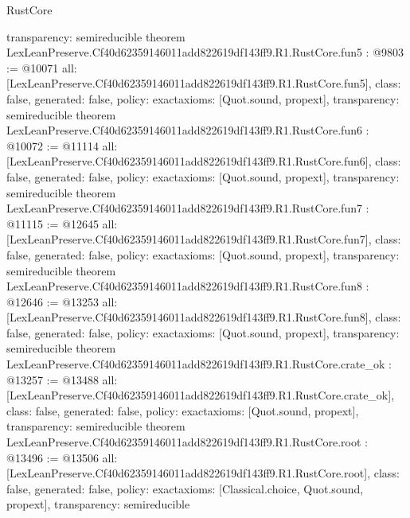 \begin{lexlean}{RustCore}
\begin{coremodule}
{  transparency: semireducible
}
theorem LexLeanPreserve.Cf40d62359146011add822619df143ff9.R1.RustCore.fun5 : @9803 := @10071 {
  all: [LexLeanPreserve.Cf40d62359146011add822619df143ff9.R1.RustCore.fun5],
  class: false,
  generated: false,
  policy: exact{axioms: [Quot.sound, propext]},
  transparency: semireducible
}
theorem LexLeanPreserve.Cf40d62359146011add822619df143ff9.R1.RustCore.fun6 : @10072 := @11114 {
  all: [LexLeanPreserve.Cf40d62359146011add822619df143ff9.R1.RustCore.fun6],
  class: false,
  generated: false,
  policy: exact{axioms: [Quot.sound, propext]},
  transparency: semireducible
}
theorem LexLeanPreserve.Cf40d62359146011add822619df143ff9.R1.RustCore.fun7 : @11115 := @12645 {
  all: [LexLeanPreserve.Cf40d62359146011add822619df143ff9.R1.RustCore.fun7],
  class: false,
  generated: false,
  policy: exact{axioms: [Quot.sound, propext]},
  transparency: semireducible
}
theorem LexLeanPreserve.Cf40d62359146011add822619df143ff9.R1.RustCore.fun8 : @12646 := @13253 {
  all: [LexLeanPreserve.Cf40d62359146011add822619df143ff9.R1.RustCore.fun8],
  class: false,
  generated: false,
  policy: exact{axioms: [Quot.sound, propext]},
  transparency: semireducible
}
theorem LexLeanPreserve.Cf40d62359146011add822619df143ff9.R1.RustCore.crate_ok : @13257 := @13488 {
  all: [LexLeanPreserve.Cf40d62359146011add822619df143ff9.R1.RustCore.crate_ok],
  class: false,
  generated: false,
  policy: exact{axioms: [Quot.sound, propext]},
  transparency: semireducible
}
theorem LexLeanPreserve.Cf40d62359146011add822619df143ff9.R1.RustCore.root : @13496 := @13506 {
  all: [LexLeanPreserve.Cf40d62359146011add822619df143ff9.R1.RustCore.root],
  class: false,
  generated: false,
  policy: exact{axioms: [Classical.choice, Quot.sound, propext]},
  transparency: semireducible
}


\end{coremodule}
\end{lexlean}
